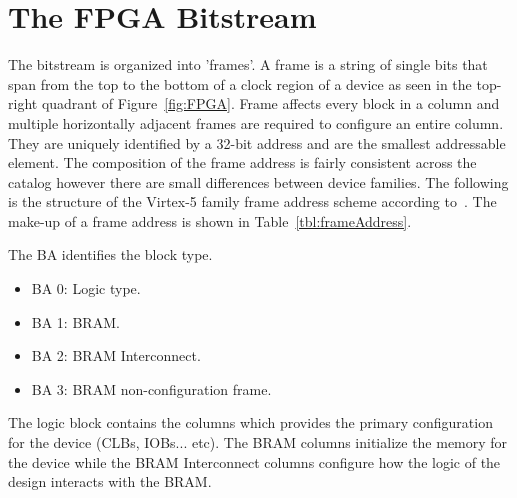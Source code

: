 \section{The \acrshort{FPGA} Bitstream} \label{sec:fpgaBitStream}
The \Xilinx bitstream is organized into 'frames'.
A frame is a string of single bits that span from the top to the bottom of a clock region of a device as seen in the top-right quadrant of Figure~\ref{fig:FPGA}.
Frame affects every block in a column and multiple horizontally adjacent frames are required to configure an entire column.
They are uniquely identified by a 32-bit address and are the smallest addressable element.
The composition of the frame address is fairly consistent across the \Xilinx catalog however there are small differences between device families.
The following is the structure of the Virtex-5 family frame address scheme according to~\cite{virtex5ConfigGuide}.
The make-up of a frame address is shown in Table~\ref{tbl:frameAddress}.
\begin{table}[h]
	\centering
	\caption{Frame Address}
	\label{tbl:frameAddress}
\end{table}
The \acrfull{BA} identifies the block type.
\begin{itemize}
	\item BA 0: Logic type.
	\item BA 1: \acrfull{BRAM}.
	\item BA 2: \acrshort{BRAM} Interconnect.
	\item BA 3: \acrshort{BRAM} non-configuration frame.
\end{itemize}
The logic block contains the columns which provides the primary configuration for the device (\acrshort{CLBs}, \acrshort{IOBs}... etc).
The \acrshort{BRAM} columns initialize the memory for the device while the \acrshort{BRAM} Interconnect columns configure how the logic of the design interacts with the \acrshort{BRAM}.


